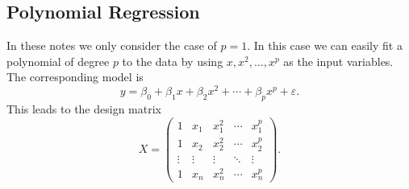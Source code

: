 \documentclass[
  a4paper,
]{article}
\theoremstyle{definition}
\theoremstyle{definition}
\theoremstyle{definition}
\theoremstyle{definition}
\theoremstyle{remark}
\begin{document}
\hypertarget{polynomial-regression}{%
\subsection{Polynomial Regression}\label{polynomial-regression}}

In these notes we only consider the case of \(p=1\). In this case we
can easily fit a polynomial of degree \(p\) to the data by using
\(x, x^2, \ldots, x^p\) as the input variables. The corresponding
model is
\begin{equation*}
  y
  = \beta_0 + \beta_1 x + \beta_2 x^2 + \cdots + \beta_p x^p + \varepsilon.
\end{equation*}
This leads to the design matrix
\begin{equation*}
  X
  = \begin{pmatrix}
      1 & x_1 & x_1^2 & \cdots & x_1^p \\
      1 & x_2 & x_2^2 & \cdots & x_2^p \\
      \vdots & \vdots & \vdots & \ddots & \vdots \\
      1 & x_n & x_n^2 & \cdots & x_n^p
    \end{pmatrix}.
\end{equation*}
\end{document}
